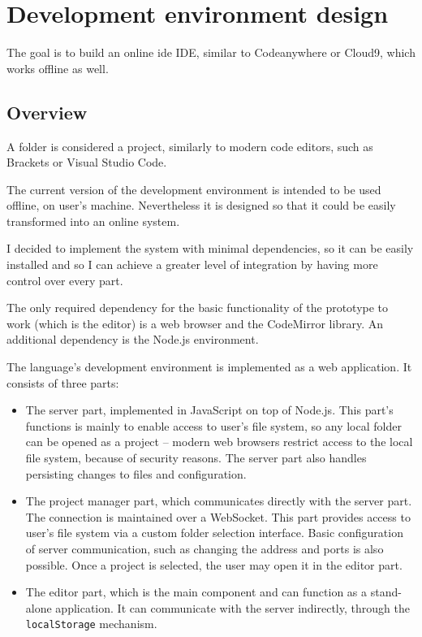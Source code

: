 \chapter{Development environment design}\label{chap:editor}
The goal is to build an online \acrlong{ide} IDE, similar to
Codeanywhere\cite{codeanywhere_website} or
Cloud9\cite{c9_website}, which works offline as well.

\section{Overview}
A folder is considered a project, similarly to modern code editors, such as Brackets or Visual Studio Code.

The current version of the development environment is intended to be used
offline, on user's machine. Nevertheless it is designed so that it could be
easily transformed into an online system.

I decided to implement the system with minimal dependencies, so it can be easily
installed and so I can achieve a greater level of integration by having more
control over every part.

The only required dependency for the basic functionality of the prototype to
work (which is the editor) is a web browser and the CodeMirror library. An
additional dependency is the Node.js environment.

The language's development environment is implemented as a web application. It
consists of three parts:
\begin{itemize}
    \item The server part, implemented in JavaScript on top of Node.js. This
      part's functions is mainly to enable access to user's file system, so any
      local folder can be opened as a project -- modern web browsers restrict
      access to the local file system, because of security reasons. The server
      part also handles persisting changes to files and configuration.
    \item The project manager part, which communicates directly with the server
      part. The connection is maintained over a
      WebSocket\cite{mdn_websockets}. This
      part provides access to user's file system via a custom folder selection
      interface. Basic configuration of server communication, such as changing
      the address and ports is also possible. Once a project is selected, the
      user may open it in the editor part.
    \item The editor part, which is the main component and can function as a
      stand-alone application. It can communicate with the server indirectly,
      through the \texttt{localStorage}
      mechanism\cite{mdn_localstorage}.
\end{itemize}

